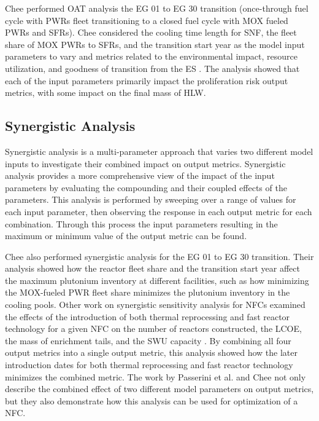 Chee \cite{chee_sensitivity_2019} performed \gls{OAT} analysis the \gls{EG} 
01 to \gls{EG} 30 transition 
(once-through fuel cycle with \glspl{PWR} fleet transitioning to a 
closed fuel cycle with \gls{MOX} fueled \glspl{PWR} and \glspl{SFR}). 
Chee considered the cooling time length 
for \gls{SNF}, the fleet share of \gls{MOX} \glspl{PWR} to \glspl{SFR}, and 
the transition start year as the model input parameters to vary and metrics 
related to the environmental impact, resource utilization, and goodness of 
transition from the \gls{ES} \cite{wigeland_nuclear_2014}. The analysis showed 
that each of the input parameters primarily impact the proliferation risk 
output metrics, with some impact on the final mass of \gls{HLW}. 

\subsection{Synergistic Analysis}
Synergistic analysis is a multi-parameter approach that varies two different 
model inputs to investigate their combined impact on output metrics. Synergistic 
analysis provides a more comprehensive view of the impact of the input 
parameters by evaluating the compounding and their coupled effects of the 
parameters.
This analysis is performed by sweeping over a range of values for each input 
parameter, then observing the response in each output metric for each 
combination. Through this process the input parameters resulting in the 
maximum or minimum value of the output metric can be found. 

Chee \cite{chee_sensitivity_2019} also performed synergistic analysis for 
the \gls{EG} 01 to \gls{EG} 30 transition. 
Their analysis showed how the reactor fleet share and the transition start 
year affect the maximum plutonium inventory at different facilities, such as 
how minimizing the \gls{MOX}-fueled \gls{PWR} fleet share minimizes the 
plutonium inventory in the cooling pools. 
Other work on synergistic sensitivity analysis for \glspl{NFC} examined the 
effects of the introduction of both thermal reprocessing and fast reactor 
technology for a given \gls{NFC} on the number of reactors constructed, 
the \gls{LCOE}, the mass of enrichment tails, and the \gls{SWU} 
capacity \cite{passerini_systematic_2014}. By combining all four output 
metrics into a single output metric, this analysis showed how the 
later introduction dates for both thermal reprocessing 
and fast reactor technology minimizes the combined metric. The work by 
Passerini 
et al. \cite{passerini_systematic_2014} and Chee \cite{chee_sensitivity_2019}
not only describe the combined effect of two different model parameters on 
output metrics, but they also demonstrate how this analysis can be used for 
optimization of a \gls{NFC}. 

